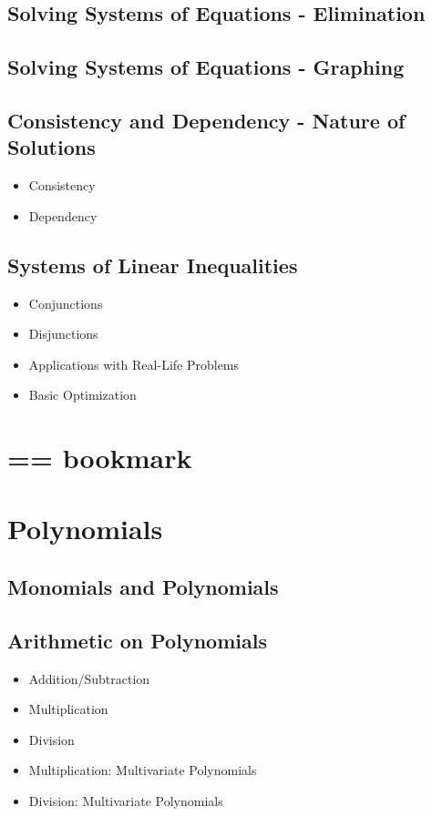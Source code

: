 \documentclass[11pt]{article}
\begin{document}
\subsection{Solving Systems of Equations - Elimination}
\subsection{Solving Systems of Equations - Graphing}
\subsection{Consistency and Dependency - Nature of Solutions}
\begin{itemize}
    \item Consistency
    \item Dependency
\end{itemize}
\subsection{Systems of Linear Inequalities}
\begin{itemize}
    \item Conjunctions
    \item Disjunctions
    \item Applications with Real-Life Problems
    \item Basic Optimization
\end{itemize}

\section*{== bookmark}

\setcounter{section}{4}
\section{Polynomials}
\subsection{Monomials and Polynomials}
\subsection{Arithmetic on Polynomials}
\begin{itemize}
    \item Addition/Subtraction
    \item Multiplication
    \item Division
    \item Multiplication: Multivariate Polynomials
    \item Division: Multivariate Polynomials
\end{itemize}
\end{document}
